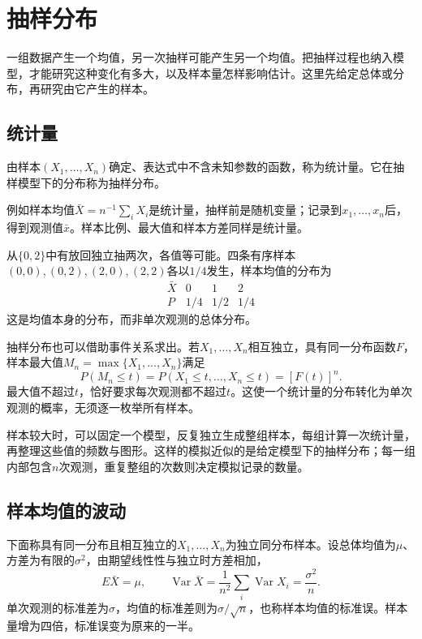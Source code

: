 \FloatBarrier
\newpage
\section{抽样分布}
\label{sec:prob-sampling-distributions}

一组数据产生一个均值，另一次抽样可能产生另一个均值。把抽样过程也纳入模型，才能研究这种变化有多大，以及样本量怎样影响估计。这里先给定总体或分布，再研究由它产生的样本。

\subsection{统计量}

\begin{definition}
由样本\((X_1,\ldots,X_n)\)确定、表达式中不含未知参数的函数，称为{\heiti 统计量}。它在抽样模型下的分布称为{\heiti 抽样分布}。
\end{definition}

例如样本均值\(\bar X=n^{-1}\sum_iX_i\)是统计量，抽样前是随机变量；记录到\(x_1,\ldots,x_n\)后，得到观测值\(\bar x\)。样本比例、最大值和样本方差同样是统计量。

从\(\{0,2\}\)中有放回独立抽两次，各值等可能。四条有序样本\((0,0),(0,2),(2,0),(2,2)\)各以\(1/4\)发生，样本均值的分布为
\[
\begin{array}{c|ccc}
\bar X&0&1&2\\\hline P&1/4&1/2&1/4
\end{array}
\]
这是均值本身的分布，而非单次观测的总体分布。

抽样分布也可以借助事件关系求出。若\(X_1,\ldots,X_n\)相互独立，具有同一分布函数\(F\)，样本最大值\(M_n=\max\{X_1,\ldots,X_n\}\)满足
\[
 P(M_n\le t)=P(X_1\le t,\ldots,X_n\le t)=[F(t)]^n.
\]
最大值不超过\(t\)，恰好要求每次观测都不超过\(t\)。这使一个统计量的分布转化为单次观测的概率，无须逐一枚举所有样本。

样本较大时，可以固定一个模型，反复独立生成整组样本，每组计算一次统计量，再整理这些值的频数与图形。这样的模拟近似的是给定模型下的抽样分布；每一组内部包含\(n\)次观测，重复整组的次数则决定模拟记录的数量。

\subsection{样本均值的波动}

下面称具有同一分布且相互独立的\(X_1,\ldots,X_n\)为{\heiti 独立同分布样本}。设总体均值为\(\mu\)、方差为有限的\(\sigma^2\)，由期望线性性与独立时方差相加，
\begin{equation}\label{eq:prob-sample-mean-characteristics}
 E\bar X=\mu,\qquad
 \operatorname{Var}\bar X=\frac1{n^2}\sum_i\operatorname{Var}X_i
 =\frac{\sigma^2}{n}.
\end{equation}
单次观测的标准差为\(\sigma\)，均值的标准差则为\(\sigma/\sqrt n\)，也称样本均值的{\heiti 标准误}。样本量增为四倍，标准误变为原来的一半。

